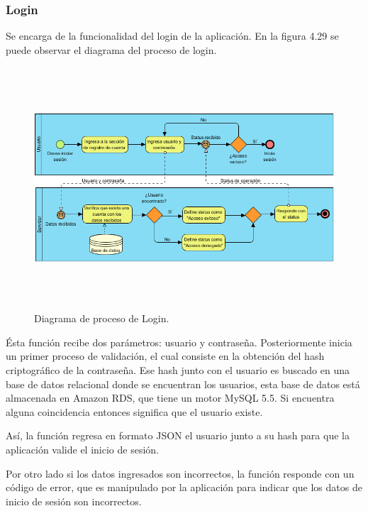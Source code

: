 \subsubsection{Login}
Se encarga de la funcionalidad del login de la aplicación. En la figura 4.29 se puede observar el diagrama del proceso de login.\par
\begin{figure}[h!]
	\centering
	\includegraphics[width=15cm,height=9cm]{imagenes/desarrollo/diagramas/BPMN_LOGIN.png}
	\caption{Diagrama de proceso de Login.}
	\label{fig:loginsuccess}
\end{figure}
Ésta función recibe dos parámetros: usuario y contraseña. Posteriormente inicia un primer proceso de validación, el cual consiste en la obtención del hash criptográfico de la contraseña. Ese hash junto con el usuario es buscado en una base de datos relacional donde se encuentran los usuarios, esta base de datos está almacenada en Amazon RDS, que tiene un motor MySQL 5.5. Si encuentra alguna coincidencia entonces significa que el usuario existe.\par Así, la función regresa en formato JSON el usuario junto a su hash para que la aplicación valide el inicio de sesión. \par

Por otro lado si los datos ingresados son incorrectos, la función responde con un código de error, que es manipulado por la aplicación para indicar que los datos de inicio de sesión son incorrectos.

